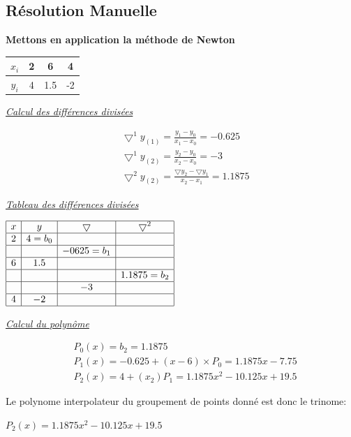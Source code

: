 \subsection{Résolution Manuelle}
\begin{center}
    \textbf{Mettons en application la méthode de Newton}\vspace{6pt}\\
\begin{tabular}{|c|c|c|c|}
    \hline
    $x_i$ & 2 & 6 & 4 \\
    \hline
    $y_i$ & 4 & 1.5 & -2\\
    \hline
\end{tabular}
\end{center}
\underline{\textit{Calcul des différences divisées}}\\
\begin{center}
    \begin{align*}
     &\bigtriangledown^{1}y_{(1)} = \frac{y_1 - y_0}{x_1-x_0} = -0.625 \\
     &\bigtriangledown^{1}y_{(2)} = \frac{y_2 - y_0}{x_2-x_0} = -3 \\
     &\bigtriangledown^{2}y_{(2)} = \frac{\bigtriangledown y_2 - \bigtriangledown y_1}{x_2-x_1} = 1.1875
    \end{align*}
\end{center}
\underline{\textit{Tableau des différences divisées}}\\
\begin{center}
$
\begin{array}{|c|c|c|c|}
\hline
x & y & \bigtriangledown & \bigtriangledown^2 \\
\hline
2 & 4 = b_0 &  & \\
\hline
& & -0625= b_1 &  \\ 
\hline
6 & 1.5&  & \\
\hline
& & & 1.1875 = b_2 \\
\hline
& &-3 & \\
\hline
4& -2 & & \\
\hline
\end{array}
$
\end{center}
\underline{\textit{Calcul du polynôme}}\\
\begin{center}
    \begin{align*}
    &P_0 (x) = b_2 = 1.1875 \\
    &P_1(x) = -0.625 + (x-6) \times P_0 = 1.1875x - 7.75 \\
    &P_2(x) = 4+ (x_2 )P_1 = 1.1875x^2-10.125x+19.5 
    \end{align*}
\end{center}
Le polynome interpolateur du groupement de points donné est donc le trinome:
\begin{center}
    $P_2(x)=1.1875x^2-10.125x+19.5$\\
\end{center}
